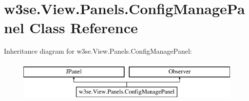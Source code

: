 \hypertarget{classw3se_1_1_view_1_1_panels_1_1_config_manage_panel}{\section{w3se.\-View.\-Panels.\-Config\-Manage\-Panel Class Reference}
\label{classw3se_1_1_view_1_1_panels_1_1_config_manage_panel}
}
Inheritance diagram for w3se.\-View.\-Panels.\-Config\-Manage\-Panel\-:\begin{figure}[H]
\begin{center}
\leavevmode
\includegraphics[height=2.000000cm]{classw3se_1_1_view_1_1_panels_1_1_config_manage_panel}
\end{center}
\end{figure}
